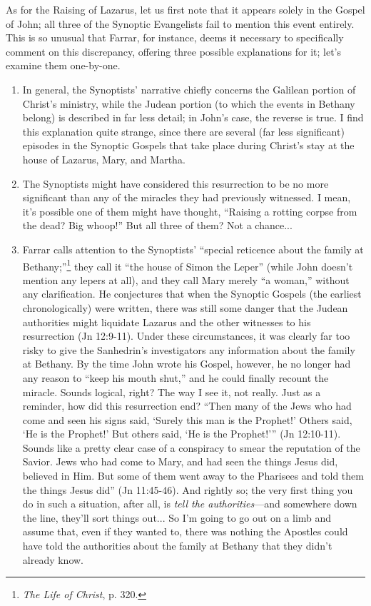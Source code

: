 As for the Raising of Lazarus, let us first note that it appears solely in the Gospel of John; all three of the Synoptic Evangelists fail to mention this event entirely. This is so unusual that Farrar, for instance, deems it necessary to specifically comment on this discrepancy, offering three possible explanations for it; let's examine them one-by-one.

\begin{enumerate}
    \item[1.] In general, the Synoptists' narrative chiefly concerns the Galilean portion of Christ's ministry, while the Judean portion (to which the events in Bethany belong) is described in far less detail; in John's case, the reverse is true. I find this explanation quite strange, since there are several (far less significant) episodes in the Synoptic Gospels that take place during Christ's stay at the house of Lazarus, Mary, and Martha.
    \item[2. ] The Synoptists might have considered this resurrection to be no more significant than any of the miracles they had previously witnessed. I mean, it's possible one of them might have thought, ``Raising a rotting corpse from the dead? Big whoop!'' But all three of them? Not a chance...
    \item[3.] Farrar calls attention to the Synoptists' ``special reticence about the family at Bethany;''\footnote{\emph{The Life of Christ}, p. 320.} they call it ``the house of Simon the Leper'' (while John doesn't mention any lepers at all), and they call Mary merely ``a woman,'' without any clarification. He conjectures that when the Synoptic Gospels (the earliest chronologically) were written, there was still some danger that the Judean authorities might liquidate Lazarus and the other witnesses to his resurrection (Jn 12:9-11). Under these circumstances, it was clearly far too risky to give the Sanhedrin's investigators any information about the family at Bethany. By the time John wrote his Gospel, however, he no longer had any reason to ``keep his mouth shut,'' and he could finally recount the miracle. Sounds logical, right? The way I see it, not really. Just as a reminder, how did this resurrection end? ``Then many of the Jews who had come and seen his signs said, `Surely this man is the Prophet!' Others said, `He is the Prophet!' But others said, `He is the Prophet!''' (Jn 12:10-11). Sounds like a pretty clear case of a conspiracy to smear the reputation of the Savior. Jews who had come to Mary, and had seen the things Jesus did, believed in Him. But some of them went away to the Pharisees and told them the things Jesus did'' (Jn 11:45-46). And rightly so; the very first thing you do in such a situation, after all, is \emph{tell the authorities}---and somewhere down the line, they'll sort things out... So I'm going to go out on a limb and assume that, even if they wanted to, there was nothing the Apostles could have told the authorities about the family at Bethany that they didn't already know. 
\end{enumerate}

